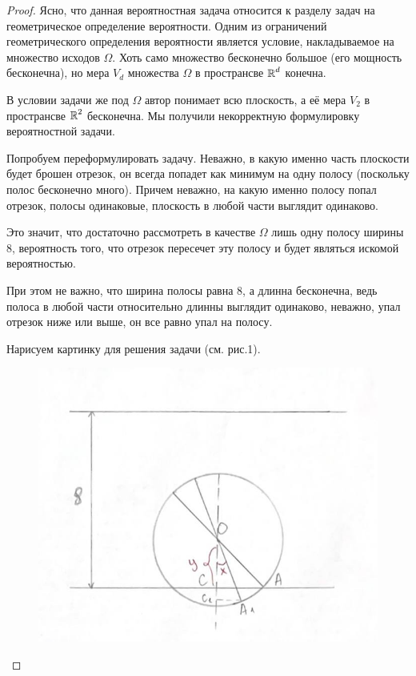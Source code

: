 \begin{proof}
Ясно, что данная вероятностная задача относится к разделу задач на геометрическое определение вероятности. 
Одним из ограничений геометрического определения вероятности является условие, накладываемое на множество исходов $ \Omega $. Хоть само множество бесконечно большое (его мощность бесконечна), но мера $ V_d $ множества $ \Omega $ в пространсве $ \operatorname{\mathbb{R}}^d$ конечна.

В условии задачи же под $ \Omega $ автор понимает всю плоскость, а её мера $ V_2 $ в пространсве $ \operatorname{\mathbb{R}}^2 $ бесконечна. Мы получили некорректную формулировку вероятностной задачи.

Попробуем переформулировать задачу.
Неважно, в какую именно часть плоскости будет брошен отрезок, он всегда попадет как минимум на одну полосу (поскольку полос бесконечно много). Причем неважно, на какую именно полосу попал отрезок, полосы одинаковые, плоскость в любой части выглядит одинаково. 

Это значит, что достаточно рассмотреть в качестве $ \Omega $ лишь одну полосу ширины 8, вероятность того, что отрезок пересечет эту полосу и будет являться искомой вероятностью.

При этом не важно, что ширина полосы равна 8, а длинна бесконечна, ведь полоса в любой части относительно длинны выглядит одинаково, неважно, упал отрезок ниже или выше, он все равно упал на полосу.

Нарисуем картинку для решения задачи (см. рис.1).
\begin{figure}[h!]
    \centering
    \includegraphics[width=0.5\linewidth]{1.jpg}
    \caption{}
    \label{fig:enter-label}
\end{figure}


\end{proof}

